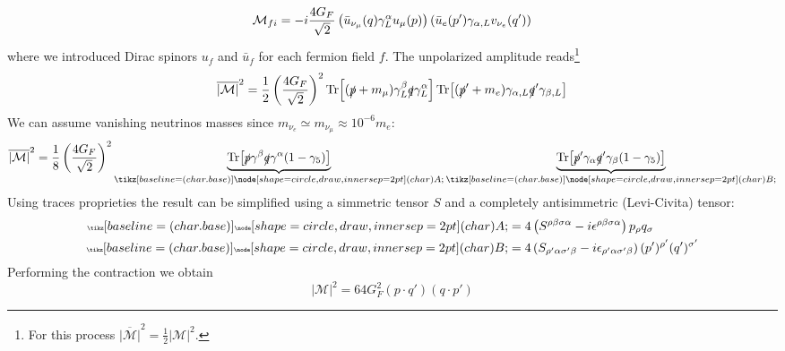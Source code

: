 \documentclass[TheoreticalPhy_ModB.tex]{subfiles}
\begin{document}
\[\mathcal M_{fi}=-i\frac{4G_F}{\sqrt2}\left(\bar u_{\nu_\mu}(q)\gamma^\alpha_Lu_\mu(p)\right)\left(\bar u_e(p')\gamma_{\alpha,L}v_{\nu_e}(q')\right)\]
where we introduced Dirac spinors $u_f$ and $\bar u_f$ for each fermion field $f$. The unpolarized amplitude reads\footnote{For this process $\overline{|\mathcal M|}^2=\frac12|\mathcal M|^2$.}
\[\overline{|\mathcal M|}^2
=\frac12\left(\frac{4G_F}{\sqrt2}\right)^2\Tr[(\slashed p+m_\mu)\gamma^\beta_L\slashed q\gamma^\alpha_L]\Tr[(\slashed p'+m_e)\gamma_{\alpha,L}\slashed q'\gamma_{\beta, L}]\]
We can assume vanishing neutrinos masses since $m_{\nu_e}\simeq m_{\nu_\mu}\approx 10^{-6}m_e$:
\[\overline{|\mathcal M|}^2
=\frac18\p{\frac{4G_F}{\sqrt2}}^2\underbrace{\Tr[\slashed p\gamma^\beta\slashed q\gamma^\alpha(1-\gamma_5)]}_{\tiny\circled A}\underbrace{\Tr[\slashed p'\gamma_{\alpha}\slashed q'\gamma_{\beta}(1-\gamma_5)]}_{\tiny\circled B}\]
Using traces proprieties the result can be simplified using a simmetric tensor $S$ and a completely antisimmetric (Levi-Civita) tensor:
\begin{align*}
{\tiny\circled A}&=4\p{S^{\rho\beta\sigma\alpha}-i\epsilon^{\rho\beta\sigma\alpha}}p_\rho q_\sigma\\
{\tiny\circled B}&=4\p{S_{\rho'\alpha\sigma'\beta}-i\epsilon_{\rho'\alpha\sigma'\beta}}(p')^{\rho'}(q')^{\sigma'}
\end{align*}
Performing the contraction we obtain 
\[{|\mathcal M|}^2
=64G_F^2(p\cdot q')(q\cdot p')\]
\end{document}
